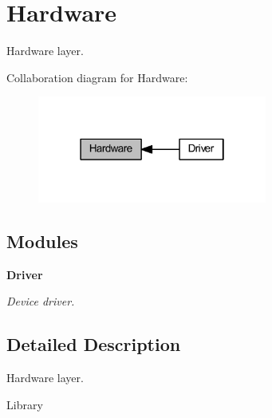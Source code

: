 \section{Hardware}
\label{group___hardware}


Hardware layer.  


Collaboration diagram for Hardware\+:
\nopagebreak
\begin{figure}[H]
\begin{center}
\leavevmode
\includegraphics[width=214pt]{group___hardware}
\end{center}
\end{figure}
\subsection*{Modules}
\begin{DoxyCompactItemize}
\item 
\textbf{ Driver}
\begin{DoxyCompactList}\small\item\em Device driver. \end{DoxyCompactList}\end{DoxyCompactItemize}


\subsection{Detailed Description}
Hardware layer. 

Library 